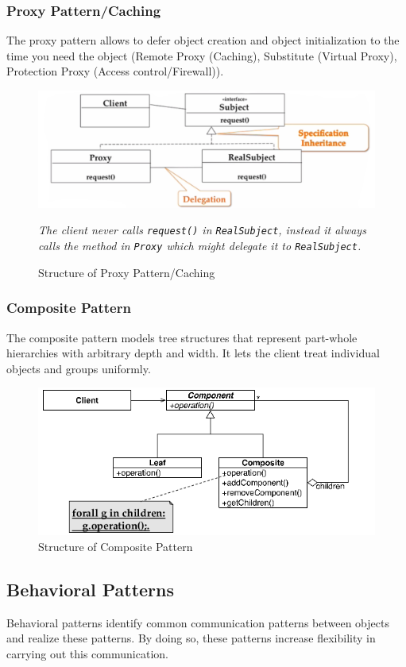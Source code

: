 \subsubsection{Proxy Pattern/Caching}
The proxy pattern allows to defer object creation and object initialization to the time you need the object (Remote Proxy (Caching), Substitute (Virtual Proxy), Protection Proxy (Access control/Firewall)).
\begin{figure}[h]
	\centering
	\includegraphics[width=\linewidth]{images/pattern_proxy.png}
	\caption{Structure of Proxy Pattern/Caching}{\textit{The client never calls \texttt{request()} in \texttt{RealSubject}, instead it always calls the method in \texttt{Proxy} which might delegate it to \texttt{RealSubject}.}}
\end{figure}
\newpage

\subsubsection{Composite Pattern}
The composite pattern models tree structures that represent part-whole hierarchies with arbitrary depth and width.
It lets the client treat individual objects and groups uniformly.
\begin{figure}[h]
	\centering
	\includegraphics[width=\linewidth]{images/pattern_composite.png}
	\caption{Structure of Composite Pattern}
\end{figure}
\newpage


\subsection{Behavioral Patterns}
Behavioral patterns identify common communication patterns between objects and realize these patterns. By doing so, these patterns increase flexibility in carrying out this communication. %

